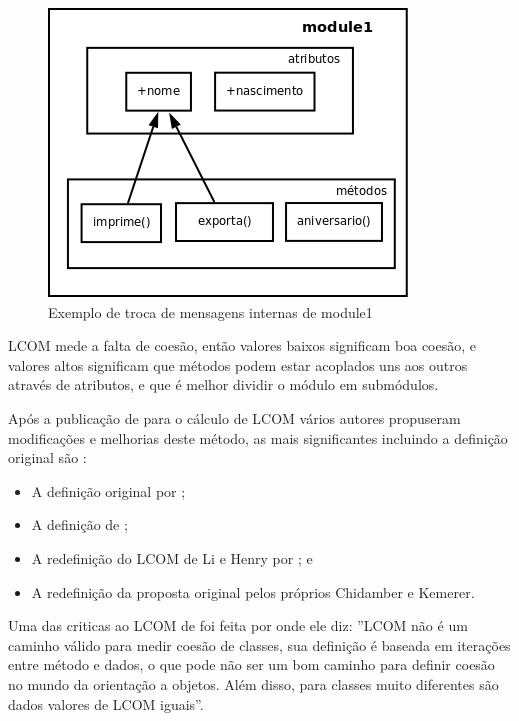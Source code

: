 \begin{figure}[h]
\center
\includegraphics[scale=0.4]{imagens/exemplo-lcom}
\caption{Exemplo de troca de mensagens internas de module1}
\label{fig:exemplo-lcom}
\end{figure}

LCOM mede a falta de coesão, então valores baixos significam boa coesão, e
valores altos significam que métodos podem estar acoplados uns aos outros
através de atributos, e que é melhor dividir o módulo em
submódulos\cite{observationsOnLCOM}.

Após a publicação de  para o cálculo de LCOM
vários autores propuseram modificações e melhorias deste método, as mais
significantes incluindo a definição original são
\cite{principalComponentAnalysisOfLCOM}:

\begin{itemize}
\item A definição original por ;
\item A definição de ;
\item A redefinição do LCOM de Li e Henry por ; e
\item A redefinição da proposta original pelos próprios Chidamber e Kemerer.
\end{itemize}

Uma das criticas ao LCOM de  foi feita por
 onde ele diz: ''LCOM não é um caminho válido
para medir coesão de classes, sua definição é baseada em iterações entre método
e dados, o que pode não ser um bom caminho para definir coesão no mundo da
orientação a objetos. Além disso, para classes muito diferentes são dados
valores de LCOM iguais''.

